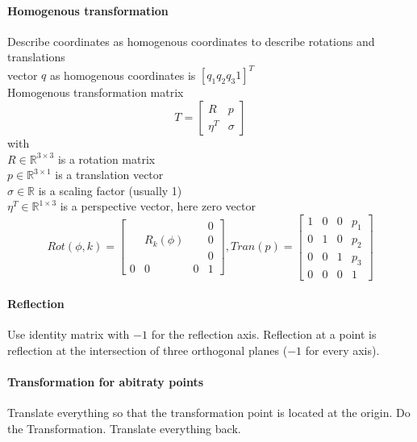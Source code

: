 \documentclass[12pt]{article}
\newcommand{\R}{\mathbb{R}}
\begin{document}
	\paragraph{Homogenous transformation} Describe coordinates as homogenous coordinates to describe rotations and translations\\
	vector $q$ as homogenous coordinates is $[q_{1} q_{2} q_{3} 1]^T$\\
	Homogenous transformation matrix
	\begin{equation}
	T = 
	\begin{bmatrix}
	R & p\\
	\eta^T & \sigma
	\end{bmatrix}
	\end{equation}
	with\\
	$R \in \R^{3 \times 3}$ is a rotation matrix\\
	$p \in \R^{3 \times 1}$ is a translation vector\\
	$\sigma \in \R$ is a scaling factor (usually 1)\\
	$\eta^T \in \R^{1 \times 3}$ is a perspective vector, here zero vector	\begin{equation}
	Rot(\phi, k) = 
	\begin{bmatrix}
	& & & 0\\
	& R_{k}(\phi) & & 0\\
	& & & 0\\
	0 & 0 & 0 & 1
	\end{bmatrix}, 
	Tran(p) = 
	\begin{bmatrix}
	1 & 0 & 0 & p_{1}\\
	0 & 1 & 0 & p_{2}\\
	0 & 0 & 1 & p_{3}\\
	0 & 0 & 0 & 1
	\end{bmatrix}
	\end{equation}

	\paragraph{Reflection} Use identity matrix with $-1$ for the reflection axis. Reflection at a point is reflection at the intersection of three orthogonal planes ($-1$ for every axis).

	\paragraph{Transformation for abitraty points} Translate everything so that the transformation point is located at the origin. Do the Transformation. Translate everything back.
	
\end{document}
